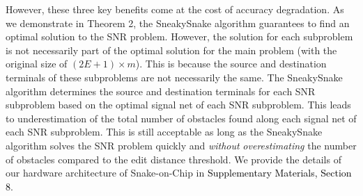 However, these three key benefits come at the cost of accuracy degradation. As we demonstrate in Theorem 2, the SneakySnake algorithm guarantees to find an optimal solution to the SNR problem. However, the solution for each subproblem is not necessarily part of the optimal solution for the main problem (with the original size of $(2E+1) \times m$). This is because the source and destination terminals of these subproblems are not necessarily the same. 
{The SneakySnake algorithm determines the source and destination terminals for each SNR subproblem based on the optimal signal net of each SNR subproblem.}
This {leads to underestimation of} the total number of obstacles found along each signal net of each SNR subproblem. This is still acceptable as long as {the SneakySnake algorithm} solves the SNR problem quickly and {\emph{without}} {\emph{overestimating}} the number of obstacles {compared to the edit distance threshold}.
We provide the details of our hardware architecture of Snake-on-Chip in \textcolor{black}{Supplementary Materials, Section 8}.


